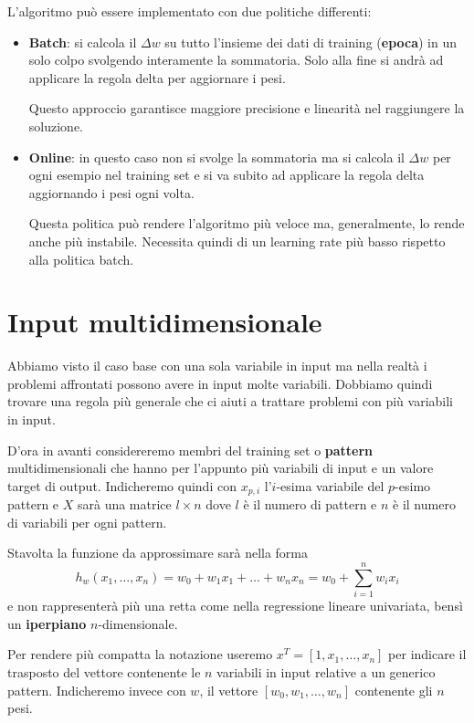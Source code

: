L'algoritmo pu\`o essere implementato con due politiche differenti:
\begin{itemize}
	\item \textbf{Batch}: si calcola il $\Delta w$ su tutto l'insieme dei dati di training (\textbf{epoca}) in un solo
	      colpo svolgendo interamente la sommatoria. Solo alla fine si andr\`a ad applicare la regola delta per aggiornare
	      i pesi.

	      Questo approccio garantisce maggiore precisione e linearit\`a nel raggiungere la soluzione.
	\item \textbf{Online}: in questo caso non si svolge la sommatoria ma si calcola il $\Delta w$ per ogni esempio nel
	      training set e si va subito ad applicare la regola delta aggiornando i pesi ogni volta.

	      Questa politica pu\`o rendere l'algoritmo pi\`u veloce ma, generalmente, lo rende anche pi\`u instabile. Necessita
	      quindi di un learning rate pi\`u basso rispetto alla politica batch.
\end{itemize}

\section{Input multidimensionale}
Abbiamo visto il caso base con una sola variabile in input ma nella realt\`a i problemi affrontati possono avere in input
molte variabili. Dobbiamo quindi trovare una regola pi\`u generale che ci aiuti a trattare problemi con pi\`u variabili in
input.

D'ora in avanti considereremo membri del training set o \textbf{pattern} multidimensionali che hanno per l'appunto pi\`u
variabili di input e un valore target di output. Indicheremo quindi con $x_{p, i}$ l'$i$-esima variabile del $p$-esimo
pattern e $X$ sar\`a una matrice $l \times n$ dove $l$ \`e il numero di pattern e $n$ \`e il numero di variabili per ogni
pattern.

Stavolta la funzione da approssimare sar\`a nella forma
\[ h_w(x_1, \dots, x_n) = w_0 + w_1 x_1 + \dots + w_n x_n = w_0 + \sum_{i=1}^n w_i x_i \]
e non rappresenter\`a pi\`u una retta come nella regressione lineare univariata, bens\`i un \textbf{iperpiano}
$n$-dimensionale.

Per rendere pi\`u compatta la notazione useremo $x^T = [1, x_1, \dots, x_n]$ per indicare il trasposto del vettore
contenente le $n$ variabili in input relative a un generico pattern. Indicheremo invece con $w$, il vettore
$[w_0, w_1, \dots, w_n]$ contenente gli $n$ pesi.

